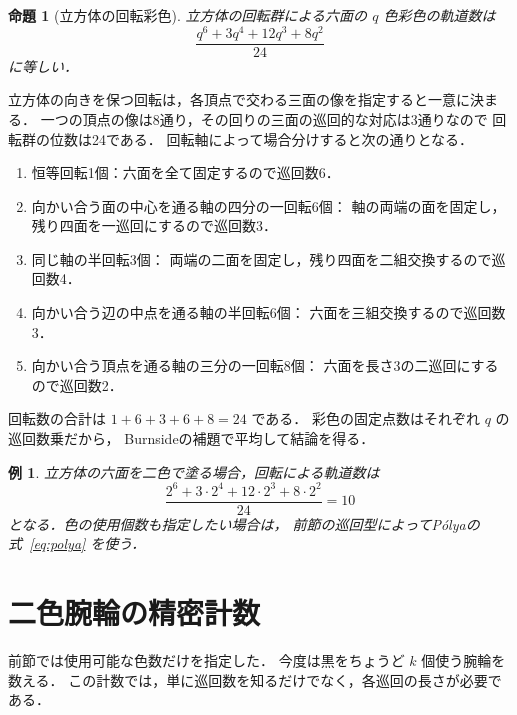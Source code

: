 \documentclass[a5paper,10pt,onecolumn]{jsarticle}
\makeatletter
\theoremstyle{mathnotetheorem}
\newtheorem{proposition}[theorem]{命題}
\newtheorem{example}[theorem]{例}
\renewcommand{\proofname}{証明}
\renewenvironment{proof}[1][\proofname]{%
  \par\pushQED{\qed}\normalfont\topsep4\p@\@plus2\p@\relax
  \trivlist\item[\hskip\labelsep\bfseries #1]\ignorespaces
}{\popQED\endtrivlist\@endpefalse}
\makeatother
\begin{document}
\begin{proposition}[立方体の回転彩色]\label{prop:cubefaces}
立方体の回転群による六面の $q$ 色彩色の軌道数は
\[
 \frac{q^6+3q^4+12q^3+8q^2}{24}
\]
に等しい．
\end{proposition}
\begin{proof}
立方体の向きを保つ回転は，各頂点で交わる三面の像を指定すると一意に決まる．
一つの頂点の像は8通り，その回りの三面の巡回的な対応は3通りなので
回転群の位数は24である．
回転軸によって場合分けすると次の通りとなる．
\begin{enumerate}
\item 恒等回転1個：六面を全て固定するので巡回数6．
\item 向かい合う面の中心を通る軸の四分の一回転6個：
軸の両端の面を固定し，残り四面を一巡回にするので巡回数3．
\item 同じ軸の半回転3個：
両端の二面を固定し，残り四面を二組交換するので巡回数4．
\item 向かい合う辺の中点を通る軸の半回転6個：
六面を三組交換するので巡回数3．
\item 向かい合う頂点を通る軸の三分の一回転8個：
六面を長さ3の二巡回にするので巡回数2．
\end{enumerate}
回転数の合計は $1+6+3+6+8=24$ である．
彩色の固定点数はそれぞれ $q$ の巡回数乗だから，
Burnsideの補題で平均して結論を得る．
\end{proof}

\begin{example}
立方体の六面を二色で塗る場合，回転による軌道数は
\[
 \frac{2^6+3\cdot2^4+12\cdot2^3+8\cdot2^2}{24}=10
\]
となる．色の使用個数も指定したい場合は，
前節の巡回型によってP\'olyaの式~\eqref{eq:polya} を使う．
\end{example}

\section{二色腕輪の精密計数}
前節では使用可能な色数だけを指定した．
今度は黒をちょうど $k$ 個使う腕輪を数える．
この計数では，単に巡回数を知るだけでなく，各巡回の長さが必要である．
\end{document}
